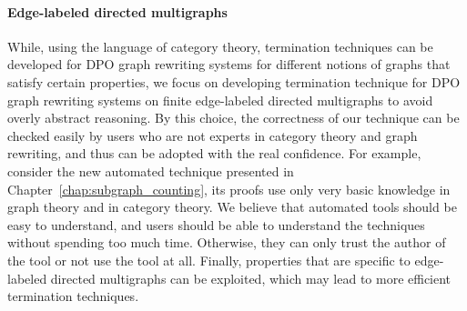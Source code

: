 \paragraph{Edge-labeled directed multigraphs}
 While, using the language of category theory, termination techniques can be developed for DPO graph rewriting systems for different notions of graphs that satisfy certain properties, we focus on developing termination technique for DPO graph rewriting systems on finite edge-labeled directed multigraphs to avoid overly abstract reasoning.
 By this choice, the correctness of our technique can be checked easily by users who are not experts in category theory and graph rewriting, and thus can be adopted with the real confidence. For example, consider the new automated technique presented in Chapter~\ref{chap:subgraph_counting}, its proofs use only very basic knowledge in graph theory and in category theory. We believe that automated tools should be easy to understand, and users should be able to understand the techniques without spending too much time. Otherwise, they can only trust the author of the tool or not use the tool at all.
 Finally, properties that are specific to edge-labeled directed multigraphs can be exploited, which may lead to more efficient termination techniques. 

